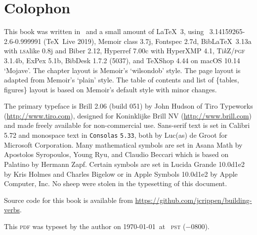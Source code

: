 

\chapter{Colophon}

\vspace*{\baselineskip}
\noindent{}This book was written in \LaTeXe\ and a small amount of \LaTeX\ 3,
using \XeLaTeX\ 3.14159265-2.6-0.999991 (\TeX\ Live 2019),
Memoir class 3.7j,
Fontspec 2.7d,
Bib\LaTeX\ 3.13a
	with \textsc{lsa}like 0.8j
	and Biber 2.12,
Hyperref 7.00c with HyperXMP 4.1,
Ti\textit{k}Z/\textsc{\MakeLowercase{PGF}} 3.1.4b,
ExPex 5.1b,
BibDesk 1.7.2 (5037),
and \TeX{}Shop 4.44
on macOS 10.14 ‘Mojave’.
The chapter layout is Memoir’s ‘wilsondob’ style. The page layout is adapted from Memoir’s ‘plain’ style. The table of contents and list of \{tables, figures\} layout is based on Memoir’s default style with minor changes.

\vspace*{\baselineskip}
\noindent{}The primary typeface is Brill 2.06 (build 051) by John Hudson of Tiro Typeworks (\url{http://www.tiro.com}), designed for Koninklijke Brill NV (\url{http://www.brill.com}) and made freely available for non-commercial use. Sans-serif text is set in \textsf{Calibri 5.72} and monospace text in \texttt{Consolas} \texttt{5.33}, both by Luc(\:as\:) de Groot for Microsoft Corporation. Many mathematical symbols are set in {\mathemafont Asana} {\mathemafont Math} {} by Apostolos Syropoulos, Young Ryu, and Claudio Beccari which is based on
Palatino
by Hermann Zapf. Certain symbols are set in {\ckfont Lucida} {\ckfont Grande} {\ckfont 10.0d1e2} by Kris Holmes and Charles Bigelow or in {\symfont Apple} {\symfont Symbols} {\symfont 10.0d1e2} by Apple Computer, Inc. No sheep were stolen in the typesetting of this document.

\vspace*{\baselineskip}
\noindent{}Source code for this book is available from \url{https://github.com/jcrippen/building-verbs}.

\vspace*{\baselineskip}
\noindent{}This \textsc{\MakeLowercase{PDF}} was typeset by the author on
	\today\
	at
	\printtime\
	\textsc{\MakeLowercase{PST}} (\:−0800\:).